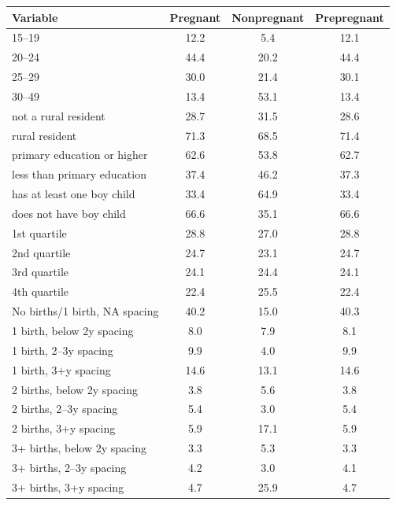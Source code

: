 \begin{tabular}{lccc}
\hline
Variable & Pregnant & Nonpregnant & Prepregnant \\ 
\hline
15–19&12.2&5.4&12.1\\
20–24&44.4&20.2&44.4\\
25–29&30.0&21.4&30.1\\
30–49&13.4&53.1&13.4\\
not a rural resident&28.7&31.5&28.6\\
rural resident&71.3&68.5&71.4\\
primary education or higher&62.6&53.8&62.7\\
less than primary education&37.4&46.2&37.3\\
has at least one boy child&33.4&64.9&33.4\\
does not have boy child&66.6&35.1&66.6\\
1st quartile&28.8&27.0&28.8\\
2nd quartile&24.7&23.1&24.7\\
3rd quartile&24.1&24.4&24.1\\
4th quartile&22.4&25.5&22.4\\
No births/1 birth, NA spacing&40.2&15.0&40.3\\
1 birth, below 2y spacing&8.0&7.9&8.1\\
1 birth, 2–3y spacing&9.9&4.0&9.9\\
1 birth, 3+y spacing&14.6&13.1&14.6\\
2 births, below 2y spacing&3.8&5.6&3.8\\
2 births, 2–3y spacing&5.4&3.0&5.4\\
2 births, 3+y spacing&5.9&17.1&5.9\\
3+ births, below 2y spacing&3.3&5.3&3.3\\
3+ births, 2–3y spacing&4.2&3.0&4.1\\
3+ births, 3+y spacing&4.7&25.9&4.7\\
\hline
\end{tabular}
